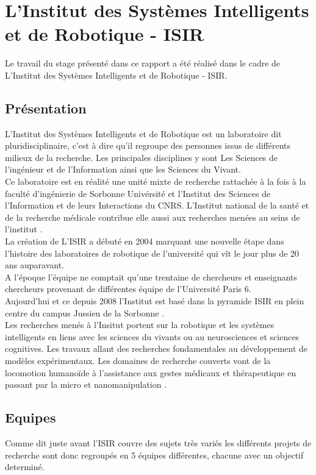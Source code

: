 \chapter{L'Institut des Systèmes Intelligents et de Robotique - ISIR}
Le travail du stage présenté dans ce rapport a été réalisé dans le cadre de L'Institut des Systèmes Intelligents et de Robotique - ISIR. 
\section{Présentation}
L'Institut des Systèmes Intelligents et de Robotique est un laboratoire dit pluridisciplinaire, c'est à dire qu'il regroupe des personnes issus de différents milieux de la recherche. Les principales disciplines y sont Les Sciences de l'ingénieur et de l'Information ainsi que les Sciences du Vivant.\\
Ce laboratoire est en réalité une unité mixte de recherche rattachée à la fois à la faculté d'ingénierie de  Sorbonne Univérsité et l’Institut des Sciences de l'Information et de leurs Interactions du CNRS. L’Institut national de la santé et de la recherche médicale contribue elle aussi aux recherches menées au seins de l'institut \cite{noauthor_isir_nodate}.\\

La création de L'ISIR a débuté en 2004 marquant une nouvelle étape dans l'histoire des laboratoires de robotique de l'université qui vît le jour plus de 20 ans auparavant.\\
A l'époque l'équipe ne comptait qu'une trentaine de chercheurs et enseignants chercheurs provenant de différentes équipe de l'Université Paris 6.\\
Aujourd'hui et ce depuis 2008 l'Institut est basé dans la pyramide ISIR en plein  centre du campus Jussieu de la Sorbonne \cite{noauthor_isir_nodate-1}.\\

Les recherches menés à l'Insitut portent sur la robotique et les systèmes intelligents en liens avec les sciences du vivants ou au neurosciences et sciences cognitives. Les travaux allant des recherches fondamentales au développement de modèles expérimentaux.  Les domaines de recherche couverts vont de la locomotion humanoïde à l'assistance aux gestes médicaux et thérapeutique en passant par la micro et nanomanipulation \cite{noauthor_isir_nodate-2}.

\section{Equipes}
Comme dit juste avant l'ISIR couvre des sujets très variés les différents projets de recherche sont donc regroupés en 5 équipes différentes, chacune avec un objectif determiné. 

